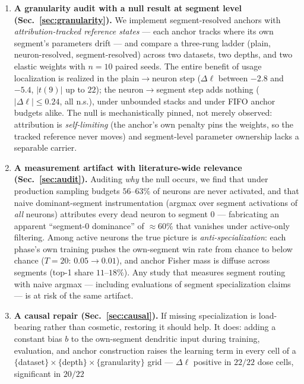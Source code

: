 \documentclass[review,12pt,number]{elsarticle}
\begin{document}
\begin{enumerate}
\item \textbf{A granularity audit with a null result at segment level
      (Sec.~\ref{sec:granularity}).} We implement segment-resolved anchors
      with \emph{attribution-tracked reference states} --- each anchor tracks
      where its own segment's parameters drift --- and compare a three-rung
      ladder (plain, neuron-resolved, segment-resolved) across two datasets,
      two depths, and two elastic weights with $n{=}10$ paired seeds. The
      entire benefit of usage localization is realized in the
      plain$\to$neuron step ($\Delta\ell$ between $-2.8$ and $-5.4$,
      $|t(9)|$ up to $22$); the neuron$\to$segment step adds nothing
      ($|\Delta\ell|\le 0.24$, all n.s.), under unbounded stacks and under
      FIFO anchor budgets alike. The null is mechanistically pinned, not
      merely observed: attribution is \emph{self-limiting} (the anchor's own
      penalty pins the weights, so the tracked reference never moves) and
      segment-level parameter ownership lacks a separable carrier.
\item \textbf{A measurement artifact with literature-wide relevance
      (Sec.~\ref{sec:audit}).} Auditing \emph{why} the null occurs, we find
      that under production sampling budgets $56$--$63\%$ of neurons are
      never activated, and that naive dominant-segment instrumentation
      (argmax over segment activations of \emph{all} neurons) attributes
      every dead neuron to segment 0 --- fabricating an apparent
      ``segment-0 dominance'' of $\approx 60\%$ that vanishes under
      active-only filtering. Among active neurons the true picture is
      \emph{anti-specialization}: each phase's own training pushes the
      own-segment win rate from chance to below chance
      ($T{=}20$: $0.05 \to 0.01$), and anchor Fisher mass is diffuse across
      segments (top-1 share $11$--$18\%$). Any study that measures segment
      routing with naive argmax --- including evaluations of segment
      specialization claims --- is at risk of the same artifact.
\item \textbf{A causal repair (Sec.~\ref{sec:causal}).} If missing
      specialization is load-bearing rather than cosmetic, restoring it
      should help. It does: adding a constant bias $b$ to the own-segment
      dendritic input during training, evaluation, and anchor
      construction raises the learning term in every cell of a
      $\{$dataset$\}\times\{$depth$\}\times\{$granularity$\}$ grid ---
      $\Delta\ell$ positive in $22/22$ dose cells, significant in $20/22$

\end{enumerate}
\end{document}
